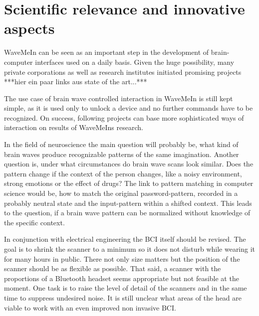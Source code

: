 \section{Scientific relevance and innovative aspects}
\label{sect:relevance}

WaveMeIn can be seen as an important step in the development of brain-computer interfaces used on a daily basis. Given the huge possibility, many private corporations as well as research institutes initiated promising projects ***hier ein paar links aus state of the art...***

The use case of brain wave controlled interaction in WaveMeIn is still kept simple, as it is used only to unlock a device and no further commands have to be recognized. On success, following projects can base more sophisticated ways of interaction on results of WaveMeIns research.

In the field of neuroscience the main question will probably be, what kind of brain waves produce recognizable patterns of the same imagination. Another question is, under what circumstances do brain wave scans look similar. Does the pattern change if the context of the person changes, like a noisy environment, strong emotions or the effect of drugs?
The link to pattern matching in computer science would be, how to match the original password-pattern, recorded in a probably neutral state and the input-pattern within a shifted context. This leads to the question, if a brain wave pattern can be normalized without knowledge of the specific context.

In conjunction with electrical engineering the BCI itself should be revised. The goal is to shrink the scanner to a minimum so it does not disturb while wearing it for many hours in public. There not only size matters but the position of the scanner should be as flexible as possible. That said, a scanner with the proportions of a Bluetooth headset seems appropriate but not feasible at the moment. One task is to raise the level of detail of the scanners and in the same time to suppress undesired noise. It is still unclear what areas of the head are viable to work with an even improved non invasive BCI.


